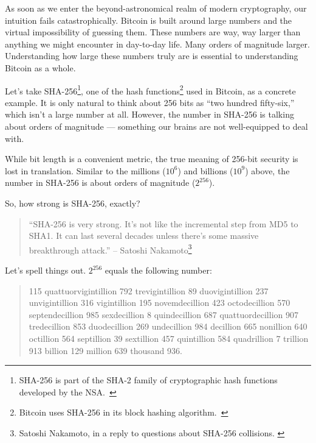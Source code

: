 As soon as we enter the beyond-astronomical realm of modern
cryptography, our intuition fails catastrophically. Bitcoin is built
around large numbers and the virtual impossibility of guessing them.
These numbers are way, way larger than anything we might encounter in
day-to-day life. Many orders of magnitude larger. Understanding how
large these numbers truly are is essential to understanding Bitcoin as a
whole.

Let's take SHA-256\footnote{SHA-256 is part of the SHA-2 family of cryptographic
hash functions developed by the NSA.~\cite{wiki:sha2}}, one of the hash
functions\footnote{Bitcoin uses SHA-256 in its block hashing
algorithm.~\cite{btcwiki:block-hashing}} used in Bitcoin, as a concrete example.
It is only natural to think about 256 bits as \enquote{two hundred fifty-six,} which
isn't a large number at all. However, the number in SHA-256 is talking about
orders of magnitude --- something our brains are not well-equipped to deal with.

While bit length is a convenient metric, the true meaning of 256-bit
security is lost in translation. Similar to the millions ($10^6$) and
billions ($10^9$) above, the number in SHA-256 is about orders of magnitude
($2^{256}$).

So, how strong is SHA-256, exactly?

\begin{samepage}\begin{quotation}
\enquote{SHA-256 is very strong. It's not like the incremental step from MD5
to SHA1. It can last several decades unless there's some massive
breakthrough attack.}
\flushright -- Satoshi Nakamoto\footnote{Satoshi Nakamoto, in a reply to questions about SHA-256 collisions. \cite{satoshi-sha256}}
\end{quotation}\end{samepage}

Let's spell things out. $2^{256}$ equals the following number:

\begin{samepage}\begin{quotation}
    115 quattuorvigintillion 792 trevigintillion 89 duovigintillion 237
    unvigintillion 316 vigintillion 195 novemdecillion 423 octodecillion 570
    septendecillion 985 sexdecillion 8 quindecillion 687 quattuordecillion 907
    tredecillion 853 duodecillion 269 undecillion 984 decillion 665 nonillion
    640 octillion 564 septillion 39 sextillion 457 quintillion 584 quadrillion 7
    trillion 913 billion 129 million 639 thousand 936.
\end{quotation}\end{samepage}

